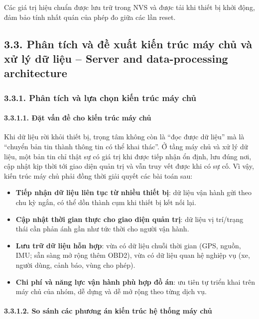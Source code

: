 \documentclass[a4paper]{extarticle}
\providecommand{\tightlist}{%
  \setlength{\itemsep}{0pt}\setlength{\parskip}{0pt}}
\begin{document}
Các giá trị hiệu chuẩn được lưu trữ trong NVS và được tải khi thiết bị
khởi động, đảm bảo tính nhất quán của phép đo giữa các lần reset.

\subsection{3.3. Phân tích và đề xuất kiến trúc máy chủ và xử lý dữ
liệu -- Server and data-processing architecture}\label{33-phan-tich-va-de-xuat-kien-truc-backend-cloud}

\subsubsection{3.3.1. Phân tích và lựa chọn kiến trúc máy chủ}

\paragraph{3.3.1.1. Đặt vấn đề cho kiến trúc máy
chủ}\label{3131-ux111ux1eb7t-vux1ea5n-ux111ux1ec1-cho-kiux1ebfn-truxfac-cloud}

Khi dữ liệu rời khỏi thiết bị, trọng tâm không còn là ``đọc được dữ
liệu'' mà là ``chuyển bản tin thành thông tin có thể khai thác''. Ở tầng
máy chủ và xử lý dữ liệu, một bản tin chỉ thật sự có giá trị khi được
 tiếp nhận ổn định, lưu đúng nơi, cập nhật kịp thời tới giao diện quản
trị và vẫn truy vết được khi có sự cố. Vì vậy, kiến trúc máy chủ phải
đồng thời giải quyết các bài toán sau:

\begin{itemize}
\tightlist
\item
  \textbf{Tiếp nhận dữ liệu liên tục từ nhiều thiết bị}: dữ liệu vận hành
  gửi theo chu kỳ ngắn, có thể dồn thành cụm khi thiết bị kết nối lại.
\item
  \textbf{Cập nhật thời gian thực cho giao diện quản trị}: dữ liệu vị trí/trạng
  thái cần phản ánh gần như tức thời cho người vận hành.
\item
  \textbf{Lưu trữ dữ liệu hỗn hợp}: vừa có dữ liệu chuỗi thời gian (GPS,
  nguồn, IMU; sẵn sàng mở rộng thêm OBD2), vừa có dữ liệu quan hệ nghiệp
  vụ (xe, người dùng, cảnh báo, vùng cho phép).
\item
  \textbf{Chi phí và năng lực vận hành phù hợp đồ án}: ưu tiên
  tự triển khai trên máy chủ của nhóm, dễ dựng và dễ mở rộng theo từng dịch vụ.
\end{itemize}

\paragraph{3.3.1.2. So sánh các phương án kiến trúc
hệ thống máy chủ}\label{3132-so-suxe1nh-cuxe1c-phux1b0ux1a1ng-uxe1n-kiux1ebfn-truxfac-cloud}
\end{document}
